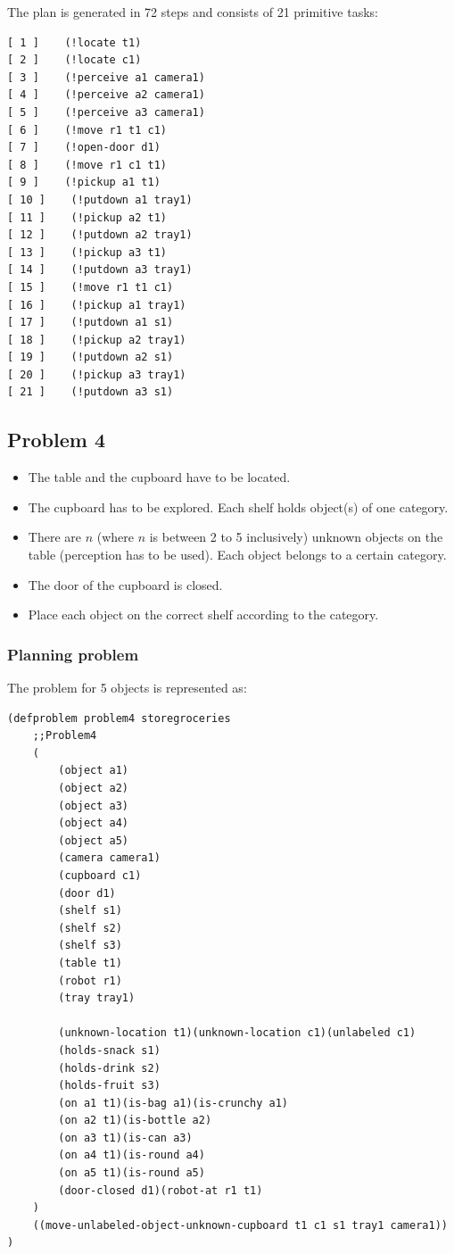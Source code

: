 \documentclass[paper=a4, fontsize=11pt]{scrartcl}
\begin{document}
The plan is generated in 72 steps and consists of 21 primitive tasks: \\

\begin{lstlisting}
[ 1 ]    (!locate t1)
[ 2 ]    (!locate c1)
[ 3 ]    (!perceive a1 camera1)
[ 4 ]    (!perceive a2 camera1)
[ 5 ]    (!perceive a3 camera1)
[ 6 ]    (!move r1 t1 c1)
[ 7 ]    (!open-door d1)
[ 8 ]    (!move r1 c1 t1)
[ 9 ]    (!pickup a1 t1)
[ 10 ]    (!putdown a1 tray1)
[ 11 ]    (!pickup a2 t1)
[ 12 ]    (!putdown a2 tray1)
[ 13 ]    (!pickup a3 t1)
[ 14 ]    (!putdown a3 tray1)
[ 15 ]    (!move r1 t1 c1)
[ 16 ]    (!pickup a1 tray1)
[ 17 ]    (!putdown a1 s1)
[ 18 ]    (!pickup a2 tray1)
[ 19 ]    (!putdown a2 s1)
[ 20 ]    (!pickup a3 tray1)
[ 21 ]    (!putdown a3 s1)
\end{lstlisting}


	\subsection{Problem 4}

		\begin{itemize}
			\item The table and the cupboard have to be located.
			\item The cupboard has to be explored. Each shelf holds object(s) of one category.
			\item There are $n$ (where $n$ is between 2 to 5 inclusively) unknown objects on the table (perception has to be used). Each object belongs to a certain category.
			\item The door of the cupboard is closed.
			\item Place each object on the correct shelf according to the category.
		\end{itemize}

	\subsubsection*{Planning problem}

	The problem for 5 objects is represented as: \\

	\begin{lstlisting}
(defproblem problem4 storegroceries
	;;Problem4
	(
		(object a1)
		(object a2)
		(object a3)
		(object a4)
		(object a5)
		(camera camera1)
		(cupboard c1)
		(door d1)
		(shelf s1)
		(shelf s2)
		(shelf s3)
		(table t1)
		(robot r1)
		(tray tray1)

		(unknown-location t1)(unknown-location c1)(unlabeled c1)
		(holds-snack s1)
		(holds-drink s2)
		(holds-fruit s3)
		(on a1 t1)(is-bag a1)(is-crunchy a1)
		(on a2 t1)(is-bottle a2)
		(on a3 t1)(is-can a3)
		(on a4 t1)(is-round a4)
		(on a5 t1)(is-round a5)
		(door-closed d1)(robot-at r1 t1)
	)
	((move-unlabeled-object-unknown-cupboard t1 c1 s1 tray1 camera1))
)
	\end{lstlisting}
\end{document}
